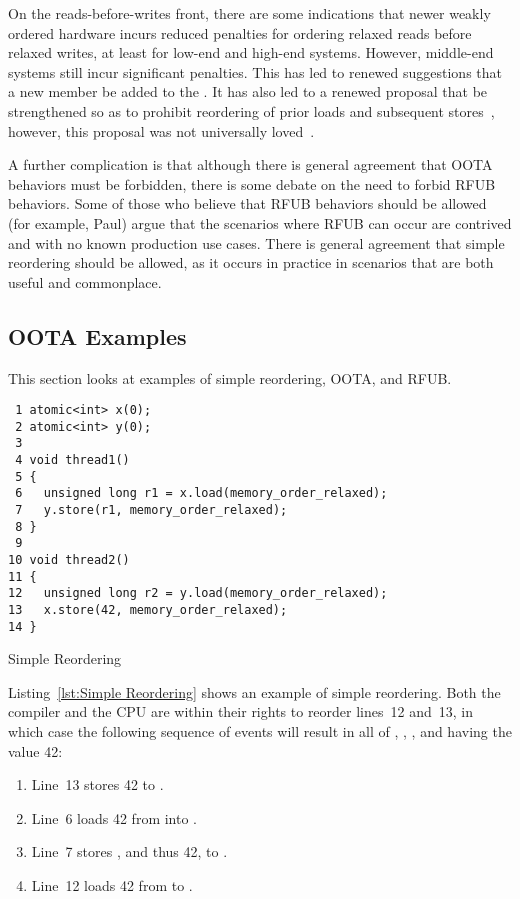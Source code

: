 \documentclass[10]{article}
\begin{document}
On the reads-before-writes front, there are some indications that newer
weakly ordered hardware incurs reduced penalties for ordering relaxed
reads before relaxed writes, at least for low-end and high-end systems.
However, middle-end systems still incur significant penalties.
This has led to renewed suggestions that a new 
member be added to the  .
It has also led to a renewed proposal that 
be strengthened so as to prohibit reordering of prior loads and subsequent
stores~\cite{LukeGeeson2023TightenRelaxed},
however, this proposal was not universally
loved~\cite{RichardGrisenthwaite2023TightenRelaxedJustSayNo}.

A further complication is that although there is general agreement that
OOTA behaviors must be forbidden, there is some debate on the need to
forbid RFUB behaviors.
Some of those who believe that RFUB behaviors should be allowed
(for example, Paul) argue that the scenarios where RFUB can occur
are contrived and with no known production use cases.
There is general agreement that simple reordering should be allowed, as
it occurs in practice in scenarios that are both useful and commonplace.

\subsection{OOTA Examples}
\label{sec:OOTA Examples}

This section looks at examples of simple reordering, OOTA, and RFUB.

\begin{listing}[tbp]
\begin{verbatim}
 1 atomic<int> x(0);
 2 atomic<int> y(0);
 3
 4 void thread1()
 5 {
 6   unsigned long r1 = x.load(memory_order_relaxed);
 7   y.store(r1, memory_order_relaxed);
 8 }
 9
10 void thread2()
11 {
12   unsigned long r2 = y.load(memory_order_relaxed);
13   x.store(42, memory_order_relaxed);
14 }
\end{verbatim}
\caption{Simple Reordering}
\label{lst:Simple Reordering}
\end{listing}

Listing~\ref{lst:Simple Reordering}
shows an example of simple reordering.
Both the compiler and the CPU are within their rights to reorder
lines~12 and~13, in which case the following sequence of events
will result in all of , , , and  having
the value 42:

\begin{enumerate}
\item	Line~13 stores 42 to .
\item	Line~6 loads 42 from  into .
\item	Line~7 stores , and thus 42, to .
\item	Line~12 loads 42 from  to .
\end{enumerate}
\end{document}
